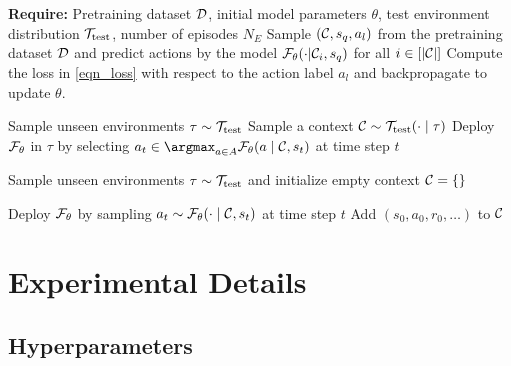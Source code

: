 \begin{algorithm}
\caption{Pretraining and Deployment of SAD (Inspired by~\citep{lee2024supervised})}         \label{alg_pretrain_deploy}
\begin{algorithmic}[1]

        \STATE \textbf{Require:} Pretraining dataset ${\mathcal D}$, initial model parameters $\theta$, test environment distribution ${\mathcal T}_{\text{test}}$, number of episodes $N_E$
        \STATE {}
            \STATE Sample $({\mathcal C}, s_q, a_l)$ from the pretraining dataset ${\mathcal D}$ and predict actions by the model ${\mathcal F}_\theta(\cdot  | {\mathcal C}_i, s_q)$ for all $i \in [|{\mathcal C}|]$
            \STATE Compute the loss in \eqref{eqn_loss} with respect to the action label $a_l$ and backpropagate to update $\theta$.
        \ENDWHILE
        
        \STATE {}
        \STATE Sample unseen environments $\tau \sim {\ensuremath{\mathcal T}}_{\text{test}}$ 
        \STATE Sample a context ${\mathcal C} \sim {\ensuremath{\mathcal T}}_{\text{test}}(\cdot \mid \tau)$
        \STATE Deploy ${\mathcal F}_\theta$ in $\tau$ by selecting $a_t \in \argmax_{a \in A} \ccalF_{\theta}(a \mid \ccalC, s_t)$ at time step $t$
        
        \STATE {}
        \STATE Sample unseen environments $\tau \sim {\ensuremath{\mathcal T}}_{\text{test}}$ and initialize empty context ${\mathcal C} = \{\}$

                \STATE Deploy ${\mathcal F}_\theta$ by sampling $a_t \sim {\ensuremath{\mathcal F}}_{\theta}(\cdot  \mid {\ensuremath{\mathcal C}}, s_t)$ at time step $t$
                \STATE Add $(s_0, a_0, r_0, \ldots)$ to ${\mathcal C}$
        \ENDFOR
\end{algorithmic}
\end{algorithm}







\section{Experimental Details}
\label{appendix_experiment_detail}



\subsection{Hyperparameters}
\label{appendix_experiment_detail_hyperparameters}

